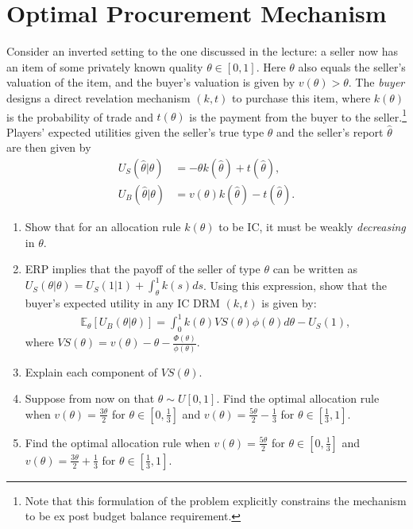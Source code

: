 \documentclass[a4paper]{article}
\begin{document}
\section{Optimal Procurement Mechanism}
	Consider an inverted setting to the one discussed in the lecture: a seller now has an item of some privately known quality $\theta \in [0,1]$. Here $\theta$ also equals the seller's valuation of the item, and the buyer's valuation is given by $v(\theta) > \theta$. The \emph{buyer} designs a direct revelation mechanism $(k,t)$ to purchase this item, where $k(\theta)$ is the probability of trade and $t(\theta)$ is the payment from the buyer to the seller.\footnote{Note that this formulation of the problem explicitly constrains the mechanism to be ex post budget balance requirement.} Players' expected utilities given the seller's true type $\theta$ and the seller's report $\hat{\theta}$ are then given by
	\begin{align*}
		U_S(\hat{\theta}|\theta) &= -\theta k(\hat{\theta}) + t(\hat{\theta}),
		\\
		U_B(\hat{\theta}|\theta) &= v(\theta) k(\hat{\theta}) - t(\hat{\theta}).
	\end{align*}
	\begin{enumerate}
		\item Show that for an allocation rule $k(\theta)$ to be IC, it must be weakly \emph{decreasing} in $\theta$.
		\item ERP implies that the payoff of the seller of type $\theta$ can be written as $U_S(\theta|\theta) = U_S(1|1) + \int_{\theta}^{1} k(s) ds $. Using this expression, show that the buyer's expected utility in any IC DRM $(k,t)$ is given by:
		\begin{align*}
			\mathbb{E}_\theta [ U_B(\theta | \theta) ] = \int_0^1 k(\theta) VS(\theta) \phi(\theta) d\theta - U_S(1),
		\end{align*}
		where $VS(\theta) = v(\theta) - \theta - \frac{\Phi(\theta)}{\phi(\theta)}$.
		\item Explain each component of $VS(\theta)$.
		\item Suppose from now on that $\theta \sim U[0,1]$. Find the optimal allocation rule when $v(\theta) = \frac{3\theta}{2}$ for $\theta \in [0,\frac{1}{3}]$ and $v(\theta) = \frac{5\theta}{2}-\frac{1}{3}$ for $\theta \in [\frac{1}{3},1]$.
		\item Find the optimal allocation rule when $v(\theta) = \frac{5\theta}{2}$ for $\theta \in [0,\frac{1}{3}]$ and $v(\theta) = \frac{3\theta}{2}+\frac{1}{3}$ for $\theta \in [\frac{1}{3},1]$.
	\end{enumerate}
		
\end{document}
